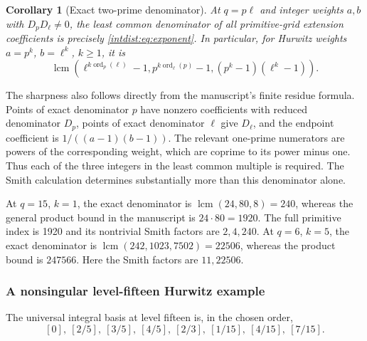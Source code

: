 \documentclass[11pt,a4paper]{article}
\numberwithin{equation}{section}
\theoremstyle{plain}
\newtheorem{corollary}[theorem]{Corollary}
\theoremstyle{definition}
\theoremstyle{remark}
\begin{document}
\begin{corollary}[Exact two-prime denominator]
\label{intdist:cor:denominator}
At $q=p\ell$ and integer weights $a,b$ with $D_pD_\ell\ne0$, the
least common denominator of all primitive-grid extension coefficients
is precisely \eqref{intdist:eq:exponent}. In particular, for Hurwitz
weights $a=p^k$, $b=\ell^k$, $k\ge1$, it is
\begin{equation}\label{intdist:eq:hurwitz-denominator}
 \operatorname{lcm}\left(
 \ell^{k\operatorname{ord}_p(\ell)}-1,
 p^{k\operatorname{ord}_\ell(p)}-1,
 (p^k-1)(\ell^k-1)\right).
\end{equation}
\end{corollary}

The sharpness also follows directly from the manuscript's finite
residue formula. Points of exact denominator $p$ have nonzero
coefficients with reduced denominator $D_p$, points of exact
denominator $\ell$ give $D_\ell$, and the endpoint coefficient is
$1/((a-1)(b-1))$. The relevant one-prime numerators are powers of the
corresponding weight, which are coprime to its power minus one.
Thus each of the three integers in the least common multiple is
required. The Smith calculation determines substantially more than
this denominator alone.

At $q=15$, $k=1$, the exact denominator is
$\operatorname{lcm}(24,80,8)=240$, whereas the general product bound
in the manuscript is $24\cdot80=1920$. The full primitive index is
1920 and its nontrivial Smith factors are $2,4,240$.
At $q=6$, $k=5$, the exact denominator is
$\operatorname{lcm}(242,1023,7502)=22506$, whereas the product bound
is $247566$. Here the Smith factors are $11,22506$.

\subsubsection{A nonsingular level-fifteen Hurwitz example}

The universal integral basis at level fifteen is, in the chosen order,
\[
 [0],\ [2/5],\ [3/5],\ [4/5],\ [2/3],\ [1/15],\ [4/15],\ [7/15].
\]
\end{document}
